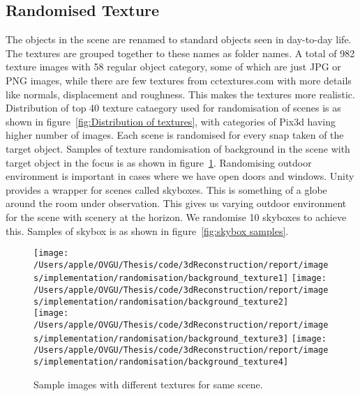 \subsection{Randomised Texture}\label{subsec:randomised-texture}

The objects in the scene are renamed to standard objects seen in day-to-day life.
The textures are grouped together to these names as folder names.
A total of 982 texture images with 58 regular object category, some of which are just JPG or PNG images, while there are few textures from cctextures.com with more details like normals, displacement and roughness.
This makes the textures more realistic.
Distribution of top 40 texture cataegory used for randomisation of scenes is as shown in figure~\ref{fig:Distribution of textures}, with categories of Pix3d having higher number of images.
Each scene is randomised for every snap taken of the target object.
Samples of texture randomisation of background in the scene with target object in the focus is as shown in figure~\ref{fig:Texture Randomisation}.
Randomising outdoor environment is important in cases where we have open doors and windows.
Unity provides a wrapper for scenes called skyboxes.
This is something of a globe around the room under observation.
This gives us varying outdoor environment for the scene with scenery at the horizon.
We randomise 10 skyboxes to achieve this.
Samples of skybox is as shown in figure~\ref{fig:skybox samples}.


\begin{figure}
    \centering
    \texttt{[image: /Users/apple/OVGU/Thesis/code/3dReconstruction/report/images/implementation/randomisation/background\_texture1]}
    \texttt{[image: /Users/apple/OVGU/Thesis/code/3dReconstruction/report/images/implementation/randomisation/background\_texture2]}\\
    \vspace{0.1cm}
    \texttt{[image: /Users/apple/OVGU/Thesis/code/3dReconstruction/report/images/implementation/randomisation/background\_texture3]}
    \texttt{[image: /Users/apple/OVGU/Thesis/code/3dReconstruction/report/images/implementation/randomisation/background\_texture4]}\\
    \caption{Sample images with different textures for same scene.}
    \label{fig:Texture Randomisation}
\end{figure}


